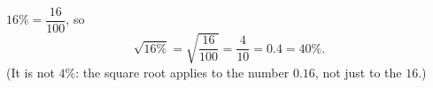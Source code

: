 $16\%=\dfrac{16}{100}$, so
\[\sqrt{16\%}=\sqrt{\dfrac{16}{100}}=\dfrac4{10}=\boxed{0.4=40\%}.\]
(It is not $4\%$: the square root applies to the number $0.16$, not just to the $16$.)
